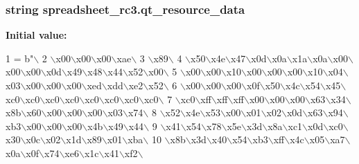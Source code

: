 \subsubsection[{qt\+\_\+resource\+\_\+data}]{\setlength{\rightskip}{0pt plus 5cm}string spreadsheet\+\_\+rc3.\+qt\+\_\+resource\+\_\+data}\label{namespacespreadsheet__rc3_a2d745bf0f20cb66a056c84b92904075f}
{\bfseries Initial value\+:}
\begin{DoxyCode}
1 = b\textcolor{stringliteral}{"\(\backslash\)}
2 \textcolor{stringliteral}{\(\backslash\)x00\(\backslash\)x00\(\backslash\)x00\(\backslash\)xae\(\backslash\)}
3 \textcolor{stringliteral}{\(\backslash\)x89\(\backslash\)}
4 \textcolor{stringliteral}{\(\backslash\)x50\(\backslash\)x4e\(\backslash\)x47\(\backslash\)x0d\(\backslash\)x0a\(\backslash\)x1a\(\backslash\)x0a\(\backslash\)x00\(\backslash\)x00\(\backslash\)x00\(\backslash\)x0d\(\backslash\)x49\(\backslash\)x48\(\backslash\)x44\(\backslash\)x52\(\backslash\)x00\(\backslash\)}
5 \textcolor{stringliteral}{\(\backslash\)x00\(\backslash\)x00\(\backslash\)x10\(\backslash\)x00\(\backslash\)x00\(\backslash\)x00\(\backslash\)x10\(\backslash\)x04\(\backslash\)x03\(\backslash\)x00\(\backslash\)x00\(\backslash\)x00\(\backslash\)xed\(\backslash\)xdd\(\backslash\)xe2\(\backslash\)x52\(\backslash\)}
6 \textcolor{stringliteral}{\(\backslash\)x00\(\backslash\)x00\(\backslash\)x00\(\backslash\)x0f\(\backslash\)x50\(\backslash\)x4c\(\backslash\)x54\(\backslash\)x45\(\backslash\)xc0\(\backslash\)xc0\(\backslash\)xc0\(\backslash\)xc0\(\backslash\)xc0\(\backslash\)xc0\(\backslash\)xc0\(\backslash\)xc0\(\backslash\)}
7 \textcolor{stringliteral}{\(\backslash\)xc0\(\backslash\)xff\(\backslash\)xff\(\backslash\)xff\(\backslash\)x00\(\backslash\)x00\(\backslash\)x00\(\backslash\)x63\(\backslash\)x34\(\backslash\)x8b\(\backslash\)x60\(\backslash\)x00\(\backslash\)x00\(\backslash\)x00\(\backslash\)x03\(\backslash\)x74\(\backslash\)}
8 \textcolor{stringliteral}{\(\backslash\)x52\(\backslash\)x4e\(\backslash\)x53\(\backslash\)x00\(\backslash\)x01\(\backslash\)x02\(\backslash\)x0d\(\backslash\)x63\(\backslash\)x94\(\backslash\)xb3\(\backslash\)x00\(\backslash\)x00\(\backslash\)x00\(\backslash\)x4b\(\backslash\)x49\(\backslash\)x44\(\backslash\)}
9 \textcolor{stringliteral}{\(\backslash\)x41\(\backslash\)x54\(\backslash\)x78\(\backslash\)x5e\(\backslash\)x3d\(\backslash\)x8a\(\backslash\)xc1\(\backslash\)x0d\(\backslash\)xc0\(\backslash\)x30\(\backslash\)x0c\(\backslash\)x02\(\backslash\)x1d\(\backslash\)x89\(\backslash\)x01\(\backslash\)xba\(\backslash\)}
10 \textcolor{stringliteral}{\(\backslash\)x8b\(\backslash\)x3d\(\backslash\)x40\(\backslash\)x54\(\backslash\)xb3\(\backslash\)xff\(\backslash\)x4c\(\backslash\)x05\(\backslash\)xa7\(\backslash\)x0a\(\backslash\)x0f\(\backslash\)x74\(\backslash\)xe6\(\backslash\)x1c\(\backslash\)x41\(\backslash\)xf2\(\backslash\)}

\end{DoxyCode}
